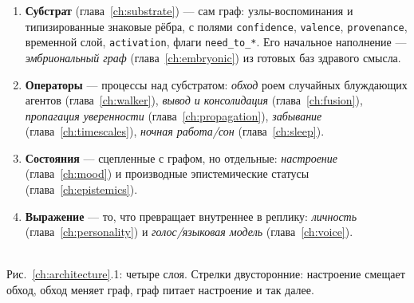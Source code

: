 \begin{enumerate}
\item \textbf{Субстрат} (глава~\ref{ch:substrate}) — сам граф: узлы-воспоминания и
типизированные знаковые рёбра, с полями \texttt{confidence}, \texttt{valence},
\texttt{provenance}, временной слой, \texttt{activation}, флаги \texttt{need\_to\_*}.
Его начальное наполнение — \emph{эмбриональный граф}
(глава~\ref{ch:embryonic}) из готовых баз здравого смысла.
\item \textbf{Операторы} — процессы над субстратом:
\emph{обход} роем случайных блуждающих агентов (глава~\ref{ch:walker}),
\emph{вывод и консолидация} (глава~\ref{ch:fusion}),
\emph{пропагация уверенности} (глава~\ref{ch:propagation}),
\emph{забывание} (глава~\ref{ch:timescales}),
\emph{ночная работа/сон} (глава~\ref{ch:sleep}).
\item \textbf{Состояния} — сцепленные с графом, но отдельные:
\emph{настроение} (глава~\ref{ch:mood}) и производные эпистемические статусы
(глава~\ref{ch:epistemics}).
\item \textbf{Выражение} — то, что превращает внутреннее в реплику:
\emph{личность} (глава~\ref{ch:personality}) и \emph{голос/языковая модель}
(глава~\ref{ch:voice}).
\end{enumerate}

\begin{center}
\\[2pt]
{\small Рис.~\ref{ch:architecture}.1: четыре слоя. Стрелки двусторонние: настроение
смещает обход, обход меняет граф, граф питает настроение и так далее.}
\end{center}

